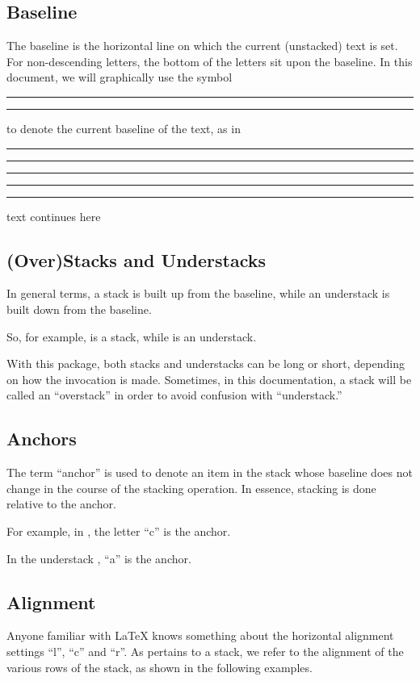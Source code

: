 \documentclass{article}
\def\rl{\rule[-.3pt]{2ex}{.6pt}}
\def\blmark{\rl\stackengine{-.9ex}{B}{\rule{.35ex}{0pt}L}{U}{l}{F}{T}{S}\rl}
\begin{document}
\subsection{Baseline}

The baseline is the horizontal line on which the current (unstacked)
text is set.  For non-descending letters, the bottom of the letters sit
upon the baseline.  In this document, we will graphically use the symbol
{\blmark} to denote the current baseline of the text, as in

\blmark\rl{}\rl\rl text continues here

\subsection{(Over)Stacks and Understacks\label{s:osus}}

In general terms, a stack is built up from the baseline, while an
understack is built down from the baseline.  

So, for example,
is a stack, while
is an understack.

With this package, both stacks and understacks can be long or short,
depending on how the invocation is made.  Sometimes, in this
documentation, a stack will be called an ``overstack'' in order to avoid
confusion with ``understack.''

\subsection{Anchors\label{s:anch}}

The term ``anchor'' is used to denote an item in the stack whose
baseline does not change in the course of the stacking operation.  In
essence, stacking is done relative to the anchor.

For example, in , the letter ``c'' is the anchor.  

In the understack , ``a'' is the anchor.

\subsection{Alignment\label{s:sal}}

Anyone familiar with \LaTeX{} knows something about the horizontal
alignment settings ``l'', ``c'' and ``r''.  As pertains to a stack, we
refer to the alignment of the various rows of the stack, as shown in the
following examples.
\end{document}
